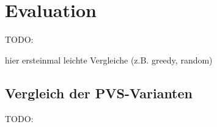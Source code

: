 \chapter{Evaluation}
\label{chapter:evaluation}



TODO:

hier ersteinmal leichte Vergleiche (z.B. greedy, random)

\section{Vergleich der PVS-Varianten}

TODO:

